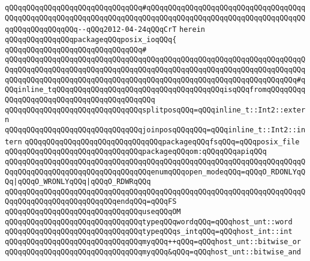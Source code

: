\verb|qQQqqQQqqQQqqQQqqQQqqQQqqQQqqQQq#qQQqqQQqqQQqqQQqqQQqqQQqqQQqqQQqqQQqqQQqqQQqqQQqqQQqqQQqqQQqqQQqqQQqqQQqqQQqqQQqqQQqqQQqqQQqqQQqqQQqqQQqqQQqqQQqqQQqqQQqqQQq--qQQq2012-04-24qQQqCrT|\newline
\verb|herein|\newline
\newline
\verb|qQQqqQQqqQQqqQQqpackageqQQqposix_ioqQQq{|\newline
\verb|qQQqqQQqqQQqqQQqqQQqqQQqqQQqqQQq#|\newline
\verb|qQQqqQQqqQQqqQQqqQQqqQQqqQQqqQQqqQQqqQQqqQQqqQQqqQQqqQQqqQQqqQQqqQQqqQQqqQQqqQQqqQQqqQQqqQQqqQQqqQQqqQQqqQQqqQQqqQQqqQQqqQQqqQQqqQQqqQQqqQQqqQQqqQQqqQQqqQQqqQQqqQQqqQQqqQQqqQQqqQQqqQQqqQQqqQQqqQQqqQQqqQQqqQQq#qQQqinline_tqQQqqQQqqQQqqQQqqQQqqQQqqQQqqQQqqQQqqQQqisqQQqfromqQQqqQQqqQQq|\verb|qQQqqQQqqQQqqQQqqQQqqQQqqQQqqQQq|\newline
\verb|qQQqqQQqqQQqqQQqqQQqqQQqqQQqqQQqsplitposqQQq=qQQqinline_t::Int2::extern|\newline
\verb|qQQqqQQqqQQqqQQqqQQqqQQqqQQqqQQqjoinposqQQqqQQq=qQQqinline_t::Int2::intern|\newline
\newline
\verb|qQQqqQQqqQQqqQQqqQQqqQQqqQQqqQQqpackageqQQqfsqQQq=qQQqposix_file|\newline
\newline
\verb|qQQqqQQqqQQqqQQqqQQqqQQqqQQqqQQqpackageqQQqom:qQQqqQQqapiqQQq|\newline
\verb|qQQqqQQqqQQqqQQqqQQqqQQqqQQqqQQqqQQqqQQqqQQqqQQqqQQqqQQqqQQqqQQqqQQqqQQqqQQqqQQqqQQqqQQqqQQqqQQqqQQqqQQqenumqQQqopen_modeqQQq=qQQqO_RDONLYqQQq|\verb#|qQQqO_WRONLYqQQq|qQQqO_RDWRqQQq#\newline
\verb|qQQqqQQqqQQqqQQqqQQqqQQqqQQqqQQqqQQqqQQqqQQqqQQqqQQqqQQqqQQqqQQqqQQqqQQqqQQqqQQqqQQqqQQqqQQqqQQqendqQQq=qQQqFS|\newline
\verb|qQQqqQQqqQQqqQQqqQQqqQQqqQQqqQQquseqQQqOM|\newline
\newline
\verb|qQQqqQQqqQQqqQQqqQQqqQQqqQQqqQQqtypeqQQqwordqQQq=qQQqhost_unt::word|\newline
\verb|qQQqqQQqqQQqqQQqqQQqqQQqqQQqqQQqtypeqQQqs_intqQQq=qQQqhost_int::int|\newline
\newline
\verb|qQQqqQQqqQQqqQQqqQQqqQQqqQQqqQQqmyqQQq++qQQq=qQQqhost_unt::bitwise_or|\newline
\verb|qQQqqQQqqQQqqQQqqQQqqQQqqQQqqQQqmyqQQq&qQQq=qQQqhost_unt::bitwise_and|\newline
